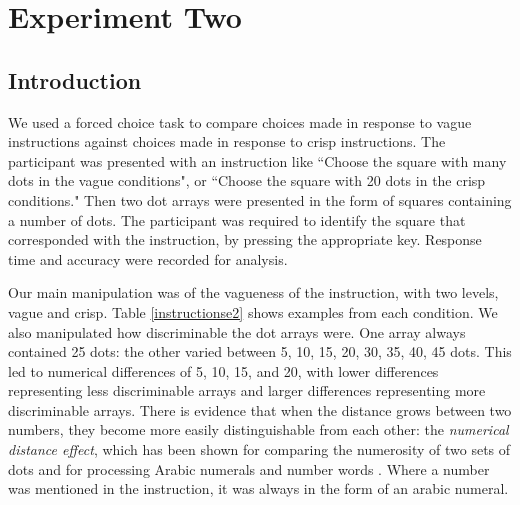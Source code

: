 \documentclass[doc,apacite]{apa6}
\begin{document}
%
%

\section{Experiment Two} 

\subsection{Introduction}
We used a forced choice task to compare choices made in response to vague instructions against choices made in response to crisp instructions. 
The participant was presented with an instruction like ``Choose the square with many dots in the vague conditions", or ``Choose the square with 20 dots in the crisp conditions."
Then two dot arrays were presented in the form of squares containing a number of dots.
The participant was required to identify the square that corresponded with the instruction, by pressing the appropriate key.
Response time and accuracy were recorded for analysis.

Our main manipulation was of the vagueness of the instruction, with two levels, vague and crisp. Table \ref{instructionse2} shows examples from each condition. 
We also manipulated how discriminable the dot arrays were. One array always contained 25 dots: the other varied between 5, 10, 15, 20, 30, 35, 40, 45 dots. This led to numerical differences of 5, 10, 15, and 20, with lower differences representing less discriminable arrays and larger differences representing more discriminable arrays. There is evidence that when the distance grows between two numbers, they become more easily distinguishable from each other: the \emph{numerical distance effect}, which has been shown for comparing the numerosity of two sets of dots \cite{van123} and for processing Arabic numerals and number words \cite{Dehaene199647}.
Where a number was mentioned in the instruction, it was always in the form of an arabic numeral.
\end{document}
